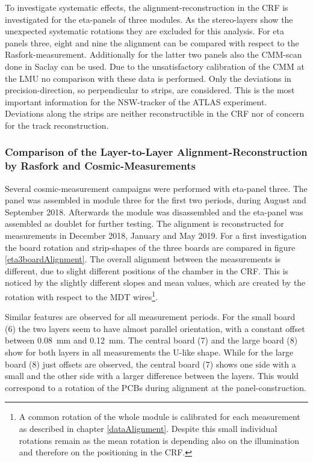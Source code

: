 \documentclass[
twoside,            %
BCOR1.4cm,          %
10pt,               %
headings=normal,    %
headsepline,        %
clearplainpage,		%
final,              %
div=14,
open=right,
bibliography=toc
]{scrreprt}
\begin{document}
To investigate systematic effects, the alignment-reconstruction in the CRF is investigated for the eta-panels of three modules.
As the stereo-layers show the unexpected systematic rotations they are excluded for this analysis.
For eta panels three, eight and nine the alignment can be compared with respect to the Rasfork-measurement.
Additionally for the latter two panels also the CMM-scan done in Saclay can be used.
Due to the unsatisfactory calibration of the CMM at the LMU no comparison with these data is performed.
Only the deviations in precision-direction, so perpendicular to strips, are considered.
This is the most important information for the NSW-tracker of the ATLAS experiment.
Deviations along the strips are neither reconstructible in the CRF nor of concern for the track reconstruction.

\subsubsection{Comparison of the Layer-to-Layer Alignment-Reconstruction by Rasfork and Cosmic-Measurements}

Several cosmic-measurement campaigns were performed with eta-panel three.
The panel was assembled in module three for the first two periods, during August and September 2018.
Afterwards the module was disassembled and the eta-panel was assembled as doublet for further testing.
The alignment is reconstructed for measurements in December 2018, January and May 2019.
For a first investigation the board rotation and strip-shapes of the three boards are compared in figure \ref{eta3boardAlignment}.
The overall alignment between the measurements is different, due to slight different positions of the chamber in the CRF.
This is noticed by the slightly different slopes and mean values, which are created by the rotation with respect to the MDT wires\footnote{
	A common rotation of the whole module is calibrated for each measurement as described in chapter \ref{dataAlignment}.
	Despite this small individual rotations remain as the mean rotation is depending also on the illumination and therefore on the positioning in the CRF.
}.

Similar features are observed for all measurement periods.
For the small board (6) the two layers seem to have almost parallel orientation, with a constant offset between \SI{0.08}{mm} and \SI{0.12}{mm}.
The central board (7) and the large board (8) show for both layers in all measurements the U-like shape.
While for the large board (8) just offsets are observed, the central board (7) shows one side with a small and the other side with a larger difference between the layers.
This would correspond to a rotation of the PCBs during alignment at the panel-construction.
\end{document}
